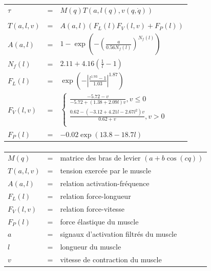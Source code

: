 \documentclass[pdftex,a4paper,11pt]{article}
\numberwithin{equation}{subsection}
\begin{document}
\paragraph{}
\begin{tabular}{lcl}
    $\tau$ & = & $M(q) T(a, l(q), v(q, \dot{q}))$ \\
    \\
    $T(a, l, v)$ & = & $A(a,l)(F_L(l) F_V(l,v) + F_P(l))$ \\
    $A(a, l)$    & = & $1 - \exp \left(- \left(\frac{a}{0.56 N_f(l)}\right)^{N_f(l)}\right)$ \\
    $N_f(l)$     & = & $2.11 + 4.16 \left(\frac{1}{l} - 1\right)$ \\
    $F_L(l)$     & = & $\exp \left(-\left|\frac{l^{1.93} - 1}{1.03}\right|^{1.87}\right)$ \\
    $F_V(l, v)$  & = & $\left\{ 
        \begin{array}{l}
            \frac{-5.72 - v}{-5.72 + (1.38 + 2.09 l) v}, v \leq 0 \\
            \frac{0.62 - \left(-3.12 + 4.21 l - 2.67 l^2\right) v}{0.62 + v}, v > 0 \\
        \end{array}
        \right.$ \\
    $F_P(l)$     & = & $-0.02 \exp(13.8 - 18.7 l)$ \\
\end{tabular}

\paragraph{}
\begin{tabular}{lcl}
    $M(q)$  & = & matrice des bras de levier $(a + b \cos (c q))$ \\
    $T(a, l, v)$ & = & tension exercée par le muscle \\
    $A(a, l)$    & = & relation activation-fréquence \\
    $F_L(l)$     & = & relation force-longueur \\
    $F_V(l, v)$  & = & relation force-vitesse \\
    $F_P(l)$     & = & force élastique du muscle \\ %
    $a$          & = & signaux d'activation filtrés du muscle \\
    $l$          & = & longueur du muscle \\
    $v$          & = & vitesse de contraction du muscle \\
\end{tabular}
\end{document}
